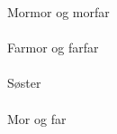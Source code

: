 \documentclass[48pt]{article}
\begin{document}
Mormor og morfar
\\
\\

Farmor og farfar
\\
\\

Søster
\\
\\

Mor og far
\end{document}
